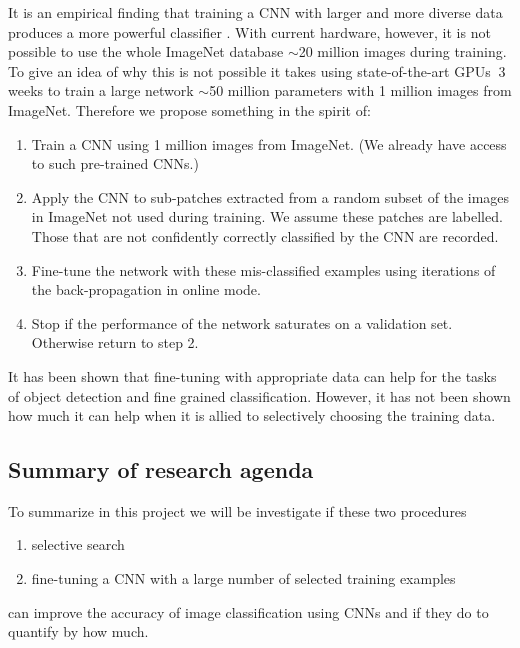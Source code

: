 \documentclass[a4paper]{article}
\begin{document}
It is an empirical finding that training a CNN with larger and more
diverse data produces a more powerful classifier
\cite{Bissacco:iccv:13,Sermanet:iclr:13}. With current hardware,
however, it is not possible to use the whole ImageNet database
$\sim$20 million images during training. To give an idea of why this
is not possible it takes using state-of-the-art GPUs $~$3 weeks to
train a large network $\sim$50 million parameters with 1 million
images from ImageNet. Therefore we propose something in the spirit of:
    \begin{enumerate}
    \item Train a CNN using 1 million images from ImageNet. (We
      already have access to such pre-trained CNNs.)
    \item Apply the CNN to sub-patches extracted from a random subset
      of the images in ImageNet not used during training. We assume
      these patches are labelled. Those that are not confidently
      correctly classified by the CNN are recorded.
    \item Fine-tune the network with these mis-classified examples
      using iterations of the back-propagation in online mode.
    \item Stop if the performance of the network saturates on a
      validation set. Otherwise return to step 2.
    \end{enumerate}
It has been shown that fine-tuning with appropriate data can help
\cite{Agrawal:eccv:14} for the tasks of object detection and fine
grained classification. However, it has not been shown how much it
can help when it is allied to selectively choosing the training data. 


\subsection{Summary of research agenda}
To summarize in this project we will be investigate if these two procedures
\begin{enumerate}
  \item selective search
  \item fine-tuning a CNN with a large number of selected training examples
\end{enumerate}
can improve the accuracy of image classification using CNNs and if
they do to quantify by how much. 
\end{document}
